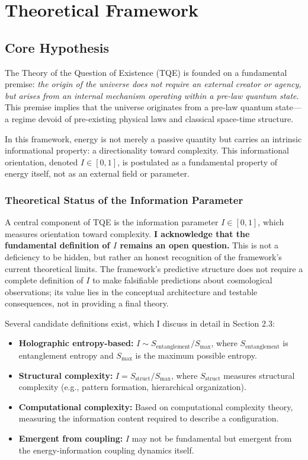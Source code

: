 \documentclass[12pt,a4paper]{article}
\theoremstyle{definition}
\theoremstyle{remark}
\begin{document}
\section{Theoretical Framework}

\subsection{Core Hypothesis}

The Theory of the Question of Existence (TQE) is founded on a fundamental premise: \emph{the origin of the universe does not require an external creator or agency, but arises from an internal mechanism operating within a pre-law quantum state}. This premise implies that the universe originates from a pre-law quantum state—a regime devoid of pre-existing physical laws and classical space-time structure.

In this framework, energy is not merely a passive quantity but carries an intrinsic informational property: a directionality toward complexity. This informational orientation, denoted $I \in [0,1]$, is postulated as a fundamental property of energy itself, not as an external field or parameter. 

\subsubsection{Theoretical Status of the Information Parameter}

A central component of TQE is the information parameter $I \in [0,1]$, which measures orientation toward complexity. \textbf{I acknowledge that the fundamental definition of $I$ remains an open question.} This is not a deficiency to be hidden, but rather an honest recognition of the framework's current theoretical limits. The framework's predictive structure does not require a complete definition of $I$ to make falsifiable predictions about cosmological observations; its value lies in the conceptual architecture and testable consequences, not in providing a final theory.

Several candidate definitions exist, which I discuss in detail in Section 2.3:
\begin{itemize}
\item \textbf{Holographic entropy-based:} $I \sim S_{\text{entanglement}}/S_{\text{max}}$, where $S_{\text{entanglement}}$ is entanglement entropy and $S_{\text{max}}$ is the maximum possible entropy.
\item \textbf{Structural complexity:} $I = S_{\text{struct}}/S_{\text{max}}$, where $S_{\text{struct}}$ measures structural complexity (e.g., pattern formation, hierarchical organization).
\item \textbf{Computational complexity:} Based on computational complexity theory, measuring the information content required to describe a configuration.
\item \textbf{Emergent from coupling:} $I$ may not be fundamental but emergent from the energy-information coupling dynamics itself.
\end{itemize}
\end{document}
